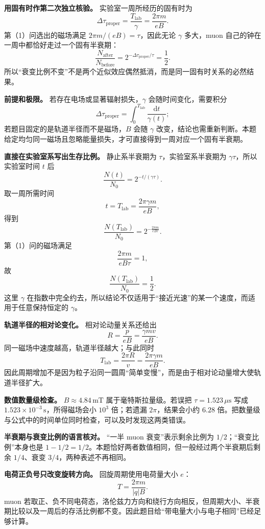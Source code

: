 \documentclass[12pt,a4paper,UTF8]{ctexart}
\begin{document}
\textbf{用固有时作第二次独立核验。} 实验室一周所经历的固有时为 \[
\Delta\tau_{\mathrm{proper}}
=\frac{T_{\mathrm{lab}}}{\gamma}
=\frac{2\pi m}{eB}.
\] 第（1）问选出的磁场满足 \(2\pi m/(eB)=\tau\)，因此无论 \(\gamma\)
多大，muon 自己的钟在一周中都恰好走过一个固有半衰期： \[
\frac{N_{\mathrm{after}}}{N_{\mathrm{before}}}
=2^{-\Delta\tau_{\mathrm{proper}}/\tau}
=\frac12.
\]
所以``衰变比例不变''不是两个近似效应偶然抵消，而是同一固有时关系的必然结果。

\textbf{前提和极限。} 若存在电场或显著辐射损失，\(\gamma\)
会随时间变化，需要积分 \[
\Delta\tau_{\mathrm{proper}}
=\int_0^{T_{\mathrm{lab}}}\frac{\mathrm dt}{\gamma(t)};
\] 若题目固定的是轨道半径而不是磁场，\(B\) 会随 \(\gamma\)
改变，结论也需重新判断。本题给定均匀同一磁场且忽略能量损失，才可直接得到一周对应一个固有半衰期。

\textbf{直接在实验室系写出生存比例。} 静止系半衰期为
\(\tau\)，实验室系半衰期为 \(\gamma\tau\)，所以实验室时间 \(t\) 后 \[
\frac{N(t)}{N_0}
=2^{-t/(\gamma\tau)}.
\] 取一周所需时间 \[
t=T_{\mathrm{lab}}
=\frac{2\pi\gamma m}{eB},
\] 得到 \[
\frac{N(T_{\mathrm{lab}})}{N_0}
=2^{-\frac{2\pi m}{eB\tau}}.
\] 第（1）问的磁场满足 \[
\frac{2\pi m}{eB\tau}=1,
\] 故 \[
\frac{N(T_{\mathrm{lab}})}{N_0}=\frac12.
\] 这里 \(\gamma\)
在指数中完全约去，所以结论不仅适用于``接近光速''的某一个速度，而适用于任意保持恒定的
\(\gamma\)。

\textbf{轨道半径的相对论变化。} 相对论动量关系还给出 \[
R=\frac{p}{eB}
=\frac{\gamma mv}{eB}.
\] 同一磁场中速度越高，轨道半径越大；与此同时 \[
T_{\mathrm{lab}}=\frac{2\pi R}{v}
=\frac{2\pi\gamma m}{eB}.
\]
因此周期增加不是因为粒子沿同一圆周``简单变慢''，而是由于相对论动量增大使轨道半径扩大。

\textbf{数值数量级检查。} \(B\approx4.84\,\mathrm{mT}\)
属于毫特斯拉量级。若误把 \(\tau=1.523\,\mu\mathrm s\) 写成
\(1.523\times10^{-3}\,\mathrm s\)，所得磁场会小 \(10^3\) 倍；若遗漏
\(2\pi\)，结果会小约 \(6.28\)
倍。把数量级与公式中的时间单位同时检查，可以及时发现这两类错误。

\textbf{半衰期与衰变比例的语言核对。} ``一半 muon 衰变''表示剩余比例为
\(1/2\)；``衰变比例''本身也是
\(1-1/2=1/2\)。本题恰好两者数值相同，但一般经过两个半衰期后剩余
\(1/4\)、衰变 \(3/4\)，两种表述不再相同。

\textbf{电荷正负号只改变旋转方向。} 回旋周期使用电荷量大小 \(e\)： \[
T=\frac{2\pi m}{|q|B}.
\] muon
若取正、负不同电荷态，洛伦兹力方向和绕行方向相反，但周期大小、半衰期比较以及一周后的存活比例都不变。因此题目给``带电量大小与电子相同''已经足够计算。
\end{document}
